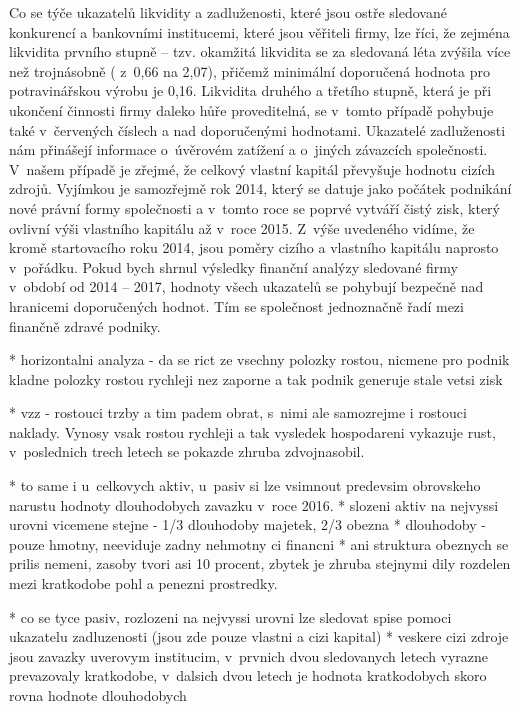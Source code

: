 Co se týče ukazatelů likvidity a zadluženosti, které jsou ostře sledované konkurencí a bankovními institucemi, které jsou věřiteli firmy, lze říci, že zejména likvidita prvního stupně – tzv. okamžitá likvidita se za sledovaná léta zvýšila více než trojnásobně ( z~0,66 na 2,07), přičemž minimální doporučená hodnota pro potravinářskou výrobu je 0,16. Likvidita druhého a třetího stupně, která je při ukončení činnosti firmy daleko hůře proveditelná, se v~tomto případě pohybuje také v~červených číslech a nad doporučenými hodnotami. Ukazatelé zadluženosti nám přinášejí informace o~úvěrovém zatížení a o~jiných závazcích společnosti. V~našem případě je zřejmé, že celkový vlastní kapitál převyšuje hodnotu cizích zdrojů. Vyjímkou je samozřejmě rok 2014, který se datuje jako počátek podnikání nové právní formy společnosti a v~tomto roce se poprvé vytváří čistý zisk, který ovlivní výši vlastního kapitálu až v~roce 2015. Z~výše uvedeného vidíme, že kromě startovacího roku 2014, jsou poměry cizího a vlastního kapitálu naprosto v~pořádku. 
Pokud bych shrnul výsledky finanční analýzy sledované firmy v~období od 2014 – 2017, hodnoty všech
ukazatelů se pohybují bezpečně nad hranicemi doporučených hodnot. Tím se společnost jednoznačně řadí mezi finančně zdravé podniky.



* horizontalni analyza - da se rict ze vsechny polozky rostou, nicmene pro podnik kladne polozky rostou rychleji nez zaporne a tak podnik generuje stale vetsi zisk 

* vzz - rostouci trzby a tim padem obrat, s~nimi ale samozrejme i rostouci naklady. Vynosy vsak rostou rychleji a tak vysledek hospodareni vykazuje rust, v~poslednich trech letech se pokazde zhruba zdvojnasobil.

* to same i u~celkovych aktiv, u~pasiv si lze vsimnout predevsim obrovskeho narustu hodnoty dlouhodobych zavazku v~roce 2016.
* slozeni aktiv na nejvyssi urovni vicemene stejne - 1/3 dlouhodoby majetek, 2/3 obezna
* dlouhodoby - pouze hmotny, neeviduje zadny nehmotny ci financni
* ani struktura obeznych se prilis nemeni, zasoby tvori asi 10 procent, zbytek je zhruba stejnymi dily rozdelen mezi kratkodobe pohl a penezni prostredky.

* co se tyce pasiv, rozlozeni na nejvyssi urovni lze sledovat spise pomoci ukazatelu zadluzenosti (jsou zde pouze vlastni a cizi kapital)
* veskere cizi zdroje jsou zavazky uverovym institucim, v~prvnich dvou sledovanych letech vyrazne prevazovaly kratkodobe, v~dalsich dvou letech je hodnota kratkodobych skoro rovna hodnote dlouhodobych

